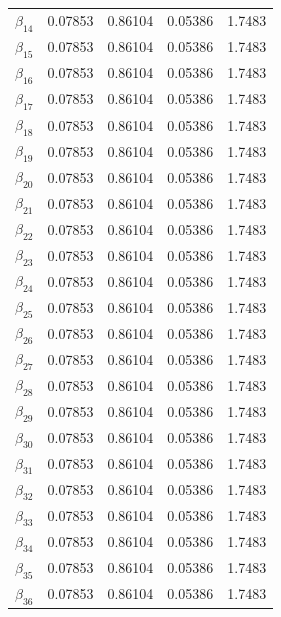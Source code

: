 \begin{table} [H]
\begin{tabularx}{\textwidth}{l|XXXX}
		$\beta_{14}$ & 0.07853 & 0.86104 & 0.05386 & 1.7483\\
		$\beta_{15}$ & 0.07853 & 0.86104 & 0.05386 & 1.7483\\
		$\beta_{16}$ & 0.07853 & 0.86104 & 0.05386 & 1.7483\\
		$\beta_{17}$ & 0.07853 & 0.86104 & 0.05386 & 1.7483\\
		$\beta_{18}$ & 0.07853 & 0.86104 & 0.05386 & 1.7483\\
		$\beta_{19}$ & 0.07853 & 0.86104 & 0.05386 & 1.7483\\
		$\beta_{20}$ & 0.07853 & 0.86104 & 0.05386 & 1.7483\\
		$\beta_{21}$ & 0.07853 & 0.86104 & 0.05386 & 1.7483\\
		$\beta_{22}$ & 0.07853 & 0.86104 & 0.05386 & 1.7483\\
		$\beta_{23}$ & 0.07853 & 0.86104 & 0.05386 & 1.7483\\
		$\beta_{24}$ & 0.07853 & 0.86104 & 0.05386 & 1.7483\\
		$\beta_{25}$ & 0.07853 & 0.86104 & 0.05386 & 1.7483\\
		$\beta_{26}$ & 0.07853 & 0.86104 & 0.05386 & 1.7483\\
		$\beta_{27}$ & 0.07853 & 0.86104 & 0.05386 & 1.7483\\
		$\beta_{28}$ & 0.07853 & 0.86104 & 0.05386 & 1.7483\\
		$\beta_{29}$ & 0.07853 & 0.86104 & 0.05386 & 1.7483\\
		$\beta_{30}$ & 0.07853 & 0.86104 & 0.05386 & 1.7483\\
		$\beta_{31}$ & 0.07853 & 0.86104 & 0.05386 & 1.7483\\
		$\beta_{32}$ & 0.07853 & 0.86104 & 0.05386 & 1.7483\\
		$\beta_{33}$ & 0.07853 & 0.86104 & 0.05386 & 1.7483\\
		$\beta_{34}$ & 0.07853 & 0.86104 & 0.05386 & 1.7483\\
		$\beta_{35}$ & 0.07853 & 0.86104 & 0.05386 & 1.7483\\
		$\beta_{36}$ & 0.07853 & 0.86104 & 0.05386 & 1.7483\\ \hline
	\end{tabularx}
\end{table}